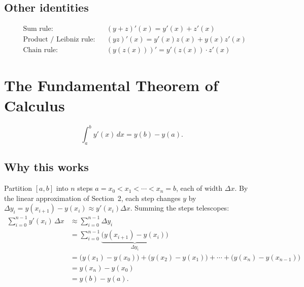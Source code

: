 \subsection{Other identities}
\begin{align*}
  &\text{Sum rule:}&& (y+z)'(x) = y'(x) + z'(x) \\
  &\text{Product / Leibniz rule:}&&   (yz)'(x) = y'(x)z(x) + y(x)z'(x) \\
  &\text{Chain rule:}&&   \left (y(z(x))\right )' = y'(z(x)) \cdot z'(x)
\end{align*}







\section{The Fundamental Theorem of Calculus}
\[
\int_a^b y'(x)\,dx = y(b) - y(a).
\]

\subsection{Why this works}
Partition $[a,b]$ into $n$ steps $a=x_0<x_1<\cdots<x_n=b$, each of
width $\Delta x$. By the linear approximation of Section~2, each step
changes $y$ by $\Delta y_i = y(x_{i+1})-y(x_i)\approx y'(x_i)\Delta x$. Summing the
steps telescopes:
\begin{align*}
  \sum_{i=0}^{n-1} y'(x_i)\,\Delta x & \approx \sum_{i=0}^{n-1} \Delta y_i \\
  &= \sum_{i=0}^{n-1}\underbrace{\big(y(x_{i+1})-y(x_i)\big)}_{\Delta y_i} \\
  &= \big(y(x_1)-y(x_0)\big) + \big(y(x_2)-y(x_1)\big) + \cdots +
  \big(y(x_n)-y(x_{n-1})\big)\\
  &= y(x_n)-y(x_0) \\
  &= y(b)-y(a).
\end{align*}

